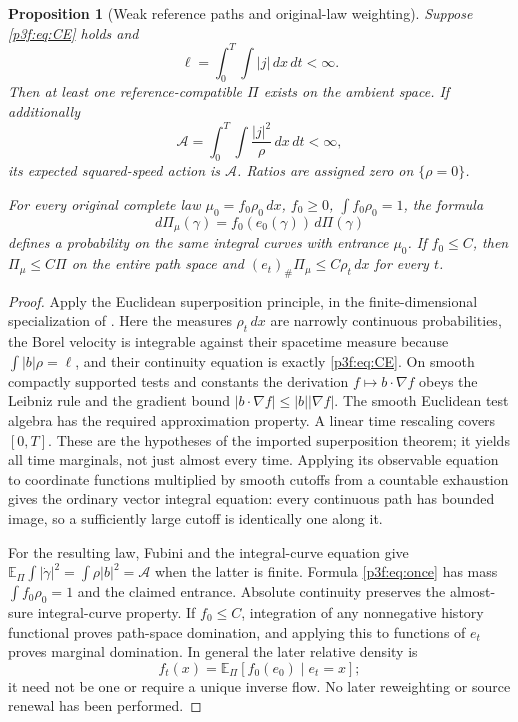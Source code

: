 \documentclass[11pt]{article}
\numberwithin{equation}{section}
\newtheorem{proposition}[theorem]{Proposition}
\theoremstyle{definition}
\theoremstyle{remark}
\begin{document}
\begin{proposition}[Weak reference paths and original-law weighting]
\label{p3f:prop:superposition}
Suppose \eqref{p3f:eq:CE} holds and
\begin{equation}\label{p3f:eq:lengthaction}
 \ell=\int_0^T\!\int |j|\,dx\,dt<\infty.
\end{equation}
Then at least one reference-compatible $\Pi$ exists on the ambient space.
If additionally
\[
 \mathcal A=\int_0^T\!\int \frac{|j|^2}{\rho}\,dx\,dt<\infty,
\]
its expected squared-speed action is $\mathcal A$. Ratios are assigned
zero on $\{\rho=0\}$.

For every original complete law
$\mu_0=f_0\rho_0\,dx$, $f_0\geq0$, $\int f_0\rho_0=1$, the formula
\begin{equation}\label{p3f:eq:once}
 d\Pi_{\mu}(\gamma)=f_0(e_0(\gamma))\,d\Pi(\gamma)
\end{equation}
defines a probability on the same integral curves with entrance $\mu_0$.
If $f_0\leq C$, then $\Pi_\mu\leq C\Pi$ on the entire path space and
$(e_t)_\#\Pi_\mu\leq C\rho_t\,dx$ for every $t$.
\end{proposition}

\begin{proof}
Apply the Euclidean superposition principle, in the finite-dimensional
specialization of \cite[arXiv v1, Remark 3.2 and Theorem 3.4]{STsuperposition}. Here the measures
$\rho_t\,dx$ are narrowly continuous probabilities, the Borel velocity
is integrable against their spacetime measure because
$\int|b|\rho=\ell$, and their continuity equation is exactly
\eqref{p3f:eq:CE}. On smooth compactly supported tests and constants the
derivation $f\mapsto b\cdot\nabla f$ obeys the Leibniz rule and the
gradient bound $|b\cdot\nabla f|\leq|b||\nabla f|$. The smooth Euclidean
test algebra has the required approximation property. A linear time
rescaling covers $[0,T]$. These are the hypotheses of the imported
superposition theorem; it yields all time marginals, not just almost
every time. Applying its observable equation to coordinate functions
multiplied by smooth cutoffs from a countable exhaustion gives the
ordinary vector integral equation: every continuous path has bounded
image, so a sufficiently large cutoff is identically one along it.

For the resulting law, Fubini and the integral-curve equation give
$\mathbb E_\Pi\int|\dot\gamma|^2
=\int\rho|b|^2=\mathcal A$ when the latter is finite. Formula
\eqref{p3f:eq:once} has mass $\int f_0\rho_0=1$ and the claimed entrance.
Absolute continuity preserves the almost-sure integral-curve property.
If $f_0\leq C$, integration of any nonnegative history functional proves
path-space domination, and applying this to functions of $e_t$ proves
marginal domination. In general the later relative density is
\[
 f_t(x)=\mathbb E_\Pi[f_0(e_0)\mid e_t=x];
\]
it need not be one or require a unique inverse flow. No later
reweighting or source renewal has been performed.
\end{proof}
\end{document}
